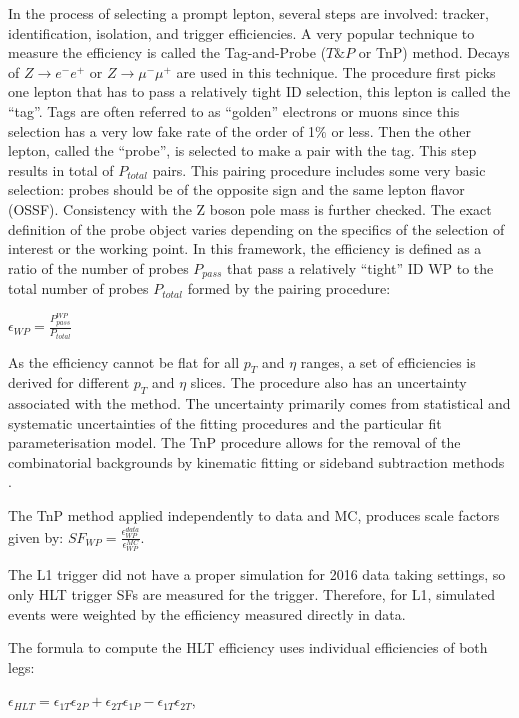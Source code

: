 In the process of selecting a prompt lepton, several steps are involved: tracker, identification, isolation, and trigger efficiencies. A very popular technique to measure the efficiency is called the Tag-and-Probe ($T\&P$ or TnP) method. Decays of $Z \rightarrow e^- e^+$ or $Z \rightarrow \mu^- \mu^+$ are used in this technique. The procedure first picks one lepton that has to pass a relatively tight ID selection, this lepton is called the ``tag''. Tags are often referred to as ``golden'' electrons or muons since this selection has a very low fake rate of the order of 1$\%$ or less. Then the other lepton, called the ``probe'', is selected to make a pair with the tag. This step results in total of $P_{total}$ pairs. This pairing procedure includes some very basic selection:  probes should be of the opposite sign and the same lepton flavor (OSSF). Consistency with the Z boson pole mass is further checked. The exact definition of the probe object varies depending on the specifics of the selection of interest or the working point. In this framework, the efficiency is defined as a ratio of the number of probes $P_{pass}$ that pass a relatively ``tight'' ID WP to the total number of probes $P_{total}$ formed by the pairing procedure:

$\epsilon_{WP} = \frac{P^{WP} _{pass}}{P_{total}} $

As the efficiency cannot be flat for all $p_T$ and $\eta$ ranges, a set of efficiencies is derived for different $p_T$ and $\eta$ slices. The procedure also has an uncertainty associated with the method. The uncertainty primarily comes from statistical and systematic uncertainties of the fitting procedures and the particular fit parameterisation model. The TnP procedure allows for the removal of the combinatorial backgrounds by kinematic fitting or sideband subtraction methods \cite{TnP}. 

The TnP method applied independently to data and MC, produces scale factors given by:
$SF_{WP} = \frac{\epsilon^{data}_{WP}}{\epsilon^{MC}_{WP}}$.

The L1 trigger did not have a proper simulation for 2016 data taking settings, so only HLT trigger SFs are measured for the trigger. Therefore, for L1, simulated events were weighted by the efficiency measured directly in data. 

The formula to compute the HLT efficiency uses individual efficiencies of both legs:

$\epsilon_{HLT} = \epsilon_{1T}\epsilon_{2P} + \epsilon_{2T}\epsilon_{1P} - \epsilon_{1T}\epsilon_{2T}$,


